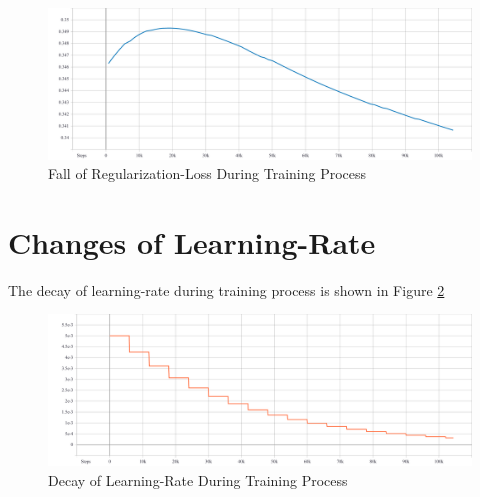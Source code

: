         \begin{figure}[h]
            \centering
            \includegraphics[width=\textwidth]{images/loss-regularization.pdf}
            \caption{Fall of Regularization-Loss During Training Process}
            \label{fig:loss_reg}
        \end{figure}
        
    \section{Changes of Learning-Rate}
        The decay of learning-rate during training process is shown in Figure \ref{fig:learning_rate}
        
        \begin{figure}[h]
            \centering
            \includegraphics[width=\textwidth]{images/learning_rate.pdf}
            \caption{Decay of Learning-Rate During Training Process}
            \label{fig:learning_rate}
        \end{figure}
        